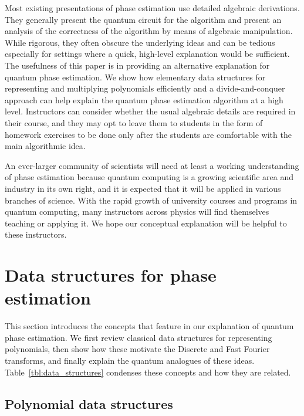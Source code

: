 \documentclass[prb,preprint]{revtex4}
\begin{document}
Most existing presentations of phase estimation use detailed algebraic derivations\cite{nielsen2010quantum, wong2022introduction}. They generally present the quantum circuit for the algorithm and present an analysis of the correctness of the algorithm by means of algebraic manipulation. While rigorous, they often obscure the underlying ideas and can be tedious especially for settings where a quick, high-level explanation would be sufficient. The usefulness of this paper is in providing an alternative explanation for quantum phase estimation. We show how elementary data structures for representing and multiplying polynomials efficiently and a divide-and-conquer approach can help explain the quantum phase estimation algorithm at a high level. Instructors can consider whether the usual algebraic details are required in their course, and they may opt to leave them to students in the form of homework exercises to be done only after the students are comfortable with the main algorithmic idea.

An ever-larger community of scientists will need at least a working understanding of phase estimation because quantum computing is a growing scientific area and industry in its own right, and it is expected that it will be applied in various branches of science. With the rapid growth of university courses and programs in quantum computing, many instructors across physics will find themselves teaching or applying it. We hope our conceptual explanation will be helpful to these instructors.
	
\section{Data structures for phase estimation}

This section introduces the concepts that feature in our explanation of quantum phase estimation. We first review classical data structures for representing polynomials, then show how these motivate the Discrete and Fast Fourier transforms, and finally explain the quantum analogues of these ideas. Table~\ref{tbl:data_structures} condenses these concepts and how they are related. 
	

	\subsection{Polynomial data structures}	
	
\end{document}
